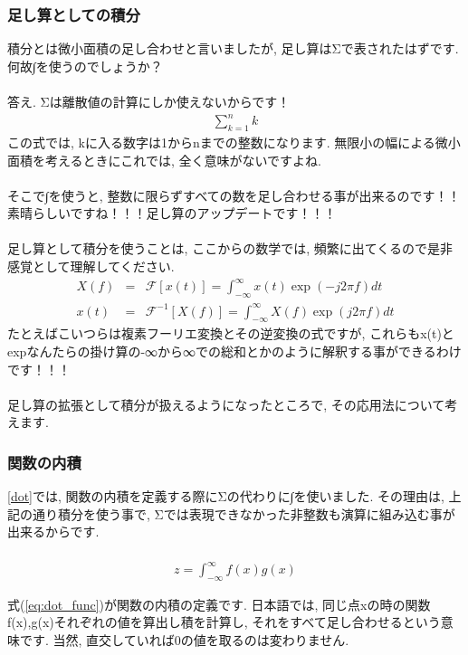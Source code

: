 \documentclass[11pt,a4paper]{jreport}
\begin{document}
\subsubsection{足し算としての積分}
積分とは微小面積の足し合わせと言いましたが, 足し算はΣで表されたはずです. 何故∫を使うのでしょうか？\\
\\
答え. Σは離散値の計算にしか使えないからです！\\
\begin{eqnarray}
\sum_{k=1}^{n} k
\end{eqnarray}
この式では, kに入る数字は1からnまでの整数になります. 無限小の幅による微小面積を考えるときにこれでは, 全く意味がないですよね.\\
\\
そこで∫を使うと, 整数に限らずすべての数を足し合わせる事が出来るのです！！\\
素晴らしいですね！！！足し算のアップデートです！！！\\
\\
足し算として積分を使うことは, ここからの数学では, 頻繁に出てくるので是非感覚として理解してください.
\begin{eqnarray}
X(f) &=& \mathcal{F}[x(t)] = \int^{\infty}_{-\infty}x(t)\exp(-j2\pi f)dt \\
 x(t) &=& \mathcal{F}^{-1}[X(f)] = \int^{\infty}_{-\infty}X(f)\exp(j2\pi f)dt 
\end{eqnarray}
たとえばこいつらは複素フーリエ変換とその逆変換の式ですが, これらもx(t)とexpなんたらの掛け算の-∞から∞での総和とかのように解釈する事ができるわけです！！！\\
\\
足し算の拡張として積分が扱えるようになったところで, その応用法について考えます. 
\subsubsection{関数の内積}
\ref{dot}では, 関数の内積を定義する際にΣの代わりに∫を使いました. その理由は, 上記の通り積分を使う事で, Σでは表現できなかった非整数も演算に組み込む事が出来るからです.\\
\\

\begin{eqnarray}
\label{eq:dot_func}
z = \int^{\infty}_{-\infty} f(x)g(x)
\end{eqnarray}

式(\ref{eq:dot_func})が関数の内積の定義です. 日本語では, 同じ点xの時の関数f(x),g(x)それぞれの値を算出し積を計算し, それをすべて足し合わせるという意味です. 当然, 直交していれば0の値を取るのは変わりません.
\end{document}
